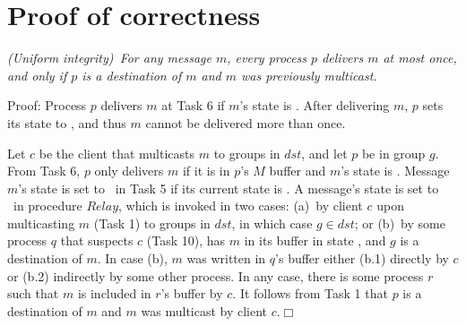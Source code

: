 
\newcommand{\Pend}{\ensuremath{\mathit{ToOrder}}\xspace}
\newcommand{\Done}{\ensuremath{\mathit{Ordered}}\xspace}
\newcommand{\Decided}{\ensuremath{\mathit{Decided}}\xspace}
\newcommand{\Buffer}{\ensuremath{\mathcal{B}}\xspace}

\clearpage
\section{Proof of correctness}

\begin{proposition}
\textit{(Uniform integrity)~For any message $m$, every process $p$ delivers $m$ at most once, and only if $p$ is a destination of $m$ and $m$ was previously multicast.}
\end{proposition}
\noindent
{\sc Proof:} 
Process $p$ delivers $m$ at Task 6 if $m$'s state is \ordered. 
After delivering $m$, $p$ sets its state to \done, and thus $m$ cannot be delivered more than once.

Let $c$ be the client that multicasts $m$ to groups in $dst$, and let $p$ be in group $g$. 
From Task 6, $p$ only delivers $m$ if it is in $p$'s $M$ buffer and $m$'s state is \ordered. 
Message $m$'s state is set to \ordered\ in Task 5 if its current state is \mcast.
A message's state is set to \mcast\ in procedure $Relay$, which is invoked in two cases:
(a)~by client $c$ upon multicasting $m$ (Task 1) to groups in $dst$, in which case $g \in dst$; or 
(b)~by some process $q$ that suspects $c$ (Task 10), has $m$ in its buffer in state \mcast, and $g$ is a destination of $m$.
In case (b), $m$ was written in $q$'s buffer either (b.1) directly by $c$ or (b.2) indirectly by some other process.
In any case, there is some process $r$ such that $m$ is included in $r$'s buffer by $c$.
It follows from Task 1 that $p$ is a destination of $m$ and $m$ was multicast by client $c$.\hfill$\Box$

